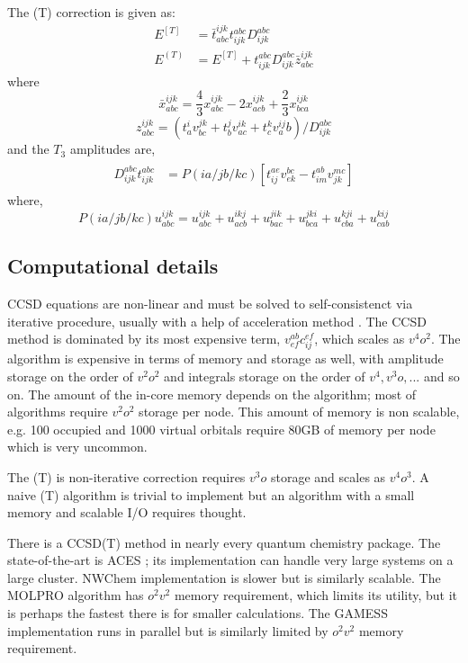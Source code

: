 \documentclass[12pt]{article} \usepackage[margin=1in]{geometry}
\begin{document}
The (T) correction is given as:
\begin{align}
  E^{[T]} &= \bar{t}^{ijk}_{abc} t^{abc}_{ijk} D^{abc}_{ijk} \\
  E^{(T)} &= E^{[T]} + t^{abc}_{ijk} D^{abc}_{ijk} \bar{z}^{ijk}_{abc}
  \label{(t)}
\end{align}
where
$$\bar{x}^{ijk}_{abc} = \frac{4}{3} x^{ijk}_{abc} - 2x^{ijk}_{acb} +
\frac{2}{3} x^{ijk}_{bca}$$
$$z^{ijk}_{abc} = (t^i_a v^{jk}_{bc} + t^j_b v^{ik}_{ac} + t^k_c v^{ij}_ab)/D^{abc}_{ijk}$$
and the $T_3$ amplitudes are,
\begin{align}
  \begin{split}
    D^{abc}_{ijk} t^{abc}_{ijk} &=
    P(ia/jb/kc) [ t^{ae}_{ij} v^{bc}_{ek} - t^{ab}_{im} v^{mc}_{jk}] 
  \end{split}
  \label{t3}
\end{align}
where,
$$P(ia/jb/kc)u^{ijk}_{abc} =
u^{ijk}_{abc} + u^{ikj}_{acb} +
u^{jik}_{bac} + u^{jki}_{bca} +
u^{kji}_{cba} + u^{kij}_{cab}$$

\subsection{Computational details}

CCSD equations are non-linear and must be solved to self-consistenct
via iterative procedure, usually with a help of acceleration method
\cite{scuseria1986accelerating}.  The CCSD method is dominated by its
most expensive term, $v^{ab}_{ef} c^{ef}_{ij}$, which scales as
$v^4o^2$.  The algorithm is expensive in terms of memory and storage
as well, with amplitude storage on the order of $v^2o^2$ and integrals
storage on the order of $v^4, v^3o, ...$ and so on.  The amount of the
in-core memory depends on the algorithm; most of algorithms require
$v^2o^2$ storage per node.  This amount of memory is non scalable,
e.g. 100 occupied and 1000 virtual orbitals require 80GB of memory per
node which is very uncommon.

The (T) is non-iterative correction requires $v^3o$ storage and scales
as $v^4o^3$.  A naive (T) algorithm is trivial to implement but an
algorithm with a small memory and scalable I/O requires thought.

There is a CCSD(T) method in nearly every quantum chemistry package.
The state-of-the-art is ACES \cite{lotrich2008parallel}; its
implementation can handle very large systems on a large cluster.
NWChem \cite{nwchem} implementation is slower but is similarly
scalable.  The MOLPRO \cite{molpro} algorithm has $o^2v^2$ memory
requirement, which limits its utility, but it is perhaps the fastest
there is for smaller calculations.  The GAMESS \cite{gamess}
implementation runs in parallel but is similarly limited by $o^2 v^2$
memory requirement.
\end{document}
